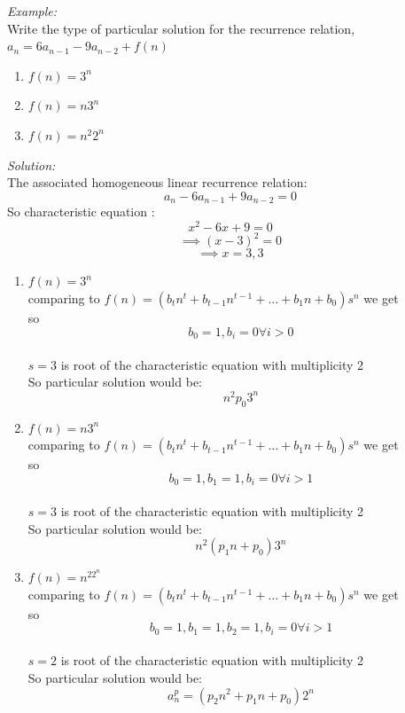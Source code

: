 \documentclass[11pt,letterpaper]{article}
\newenvironment{solution}                      
        {\begin{mdframed}\textit{Solution:} \\}
        {\end{mdframed}}
\newenvironment{example}                             
        {\noindent\textit{Example:}\\}
	{}
\begin{document}
\begin{example}
  Write the type of particular solution for the recurrence relation, $a_n = 6a_{n-1} -9a_{n-2} + f(n)$
  \begin{enumerate}
    \item $f(n) = 3^n$
    \item $f(n) = n3^n$
    \item $f(n) = n^2 2^n$
  \end{enumerate}
  \begin{solution}
    The associated homogeneous linear recurrence relation:
    \[
      a_n - 6 a_{n-1} + 9a_{n-2} = 0
    \]
    So characteristic equation :
    \[
      x^2  - 6x + 9 = 0
    \]
    \[
      \implies (x-3)^2 = 0
    \]
    \[
      \implies x = 3,3
    \]
    \begin{enumerate}
      \item $f(n) = 3^n$\\
        comparing to $f(n) = (b_tn^t + b_{t-1}n^{t-1} + \dots + b_1n+b_0) s^n$ we get\\
        so
        \[
          b_0 = 1, b_i = 0 \forall i > 0
        \]
        \\ 
        $s = 3$ is root of the characteristic equation with multiplicity 2\\
        So particular solution would be: 
        \[
          n^2 p_0 3^n
        \]
      \item $f(n) = n3^n$\\
        comparing to $f(n) = (b_tn^t + b_{t-1}n^{t-1} + \dots + b_1n+b_0) s^n$ we get\\
        so
        \[
          b_0 = 1, b_1 = 1, b_i = 0 \forall i > 1
        \]
        \\ 
        $s = 3$ is root of the characteristic equation with multiplicity 2\\
        So particular solution would be: 
        \[
          n^2 (p_1n + p_0) 3^n
        \]
      \item $f(n) = n^22^n$\\
        comparing to $f(n) = (b_tn^t + b_{t-1}n^{t-1} + \dots + b_1n+b_0) s^n$ we get\\
        so
        \[
          b_0 = 1, b_1 = 1, b_2 = 1, b_i = 0 \forall i > 1
        \]
        \\ 
        $s = 2$ is root of the characteristic equation with multiplicity 2\\
        So particular solution would be: 
        \[
          a_n^p = (p_2n^2+ p_1n + p_0) 2^n
        \]

\end{enumerate}
\end{solution}
\end{example}
\end{document}
